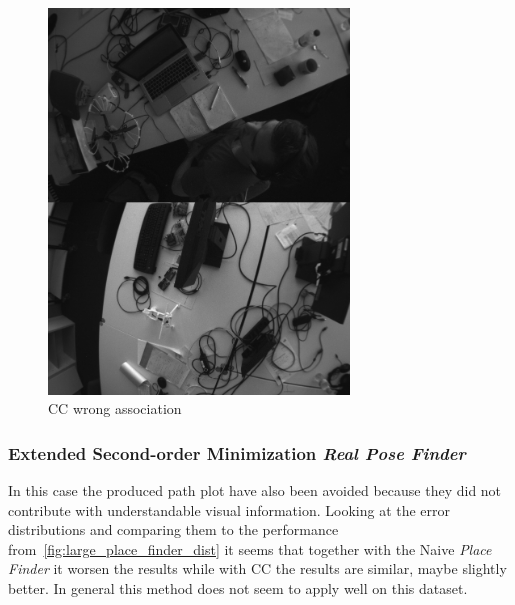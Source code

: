 \begin{figure}[htpb]
  \centering
  \includegraphics[width=8cm]{img/large_desktop/CC_wrong_asociation.png}
  \caption{CC wrong association}
  \label{fig:large_CC_wrong_asociation}
\end{figure}


\subsubsection{Extended Second-order Minimization \textit{Real Pose Finder}}
\label{ssub:extended_second_orther_minimization_real_pose_finder}

In this case the produced path plot have also been avoided because they did not contribute with understandable visual information. Looking at the error distributions and comparing them to the performance from~\ref{fig:large_place_finder_dist} it seems that together with the Naive \textit{Place Finder} it worsen the results while with CC the results are similar, maybe slightly better. In general this method does not seem to apply well on this dataset. \\

